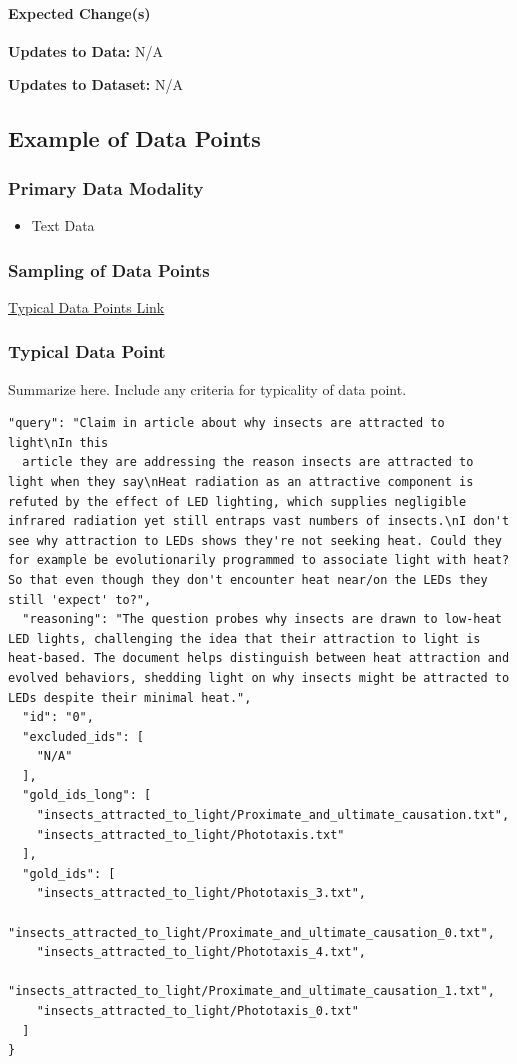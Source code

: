 \paragraph{Expected Change(s)}
\textbf{Updates to Data:} N/A

\textbf{Updates to Dataset:} N/A

\subsection{Example of Data Points}

\subsubsection{Primary Data Modality}
\begin{itemize}
    \item Text Data
\end{itemize}

\subsubsection{Sampling of Data Points}
\href{https://huggingface.co/datasets/xlangai/BRIGHT/blob/main/data_examples.pdf}{Typical Data Points Link}

\subsubsection{Typical Data Point}
Summarize here. Include any criteria for typicality of data point.

\begin{lstlisting}[breaklines]
  "query": "Claim in article about why insects are attracted to light\nIn this
  article they are addressing the reason insects are attracted to light when they say\nHeat radiation as an attractive component is refuted by the effect of LED lighting, which supplies negligible infrared radiation yet still entraps vast numbers of insects.\nI don't see why attraction to LEDs shows they're not seeking heat. Could they for example be evolutionarily programmed to associate light with heat? So that even though they don't encounter heat near/on the LEDs they still 'expect' to?",
  "reasoning": "The question probes why insects are drawn to low-heat LED lights, challenging the idea that their attraction to light is heat-based. The document helps distinguish between heat attraction and evolved behaviors, shedding light on why insects might be attracted to LEDs despite their minimal heat.",
  "id": "0",
  "excluded_ids": [
    "N/A"
  ],
  "gold_ids_long": [
    "insects_attracted_to_light/Proximate_and_ultimate_causation.txt",
    "insects_attracted_to_light/Phototaxis.txt"
  ],
  "gold_ids": [
    "insects_attracted_to_light/Phototaxis_3.txt",
    "insects_attracted_to_light/Proximate_and_ultimate_causation_0.txt",
    "insects_attracted_to_light/Phototaxis_4.txt",
    "insects_attracted_to_light/Proximate_and_ultimate_causation_1.txt",
    "insects_attracted_to_light/Phototaxis_0.txt"
  ]
}
\end{lstlisting}

